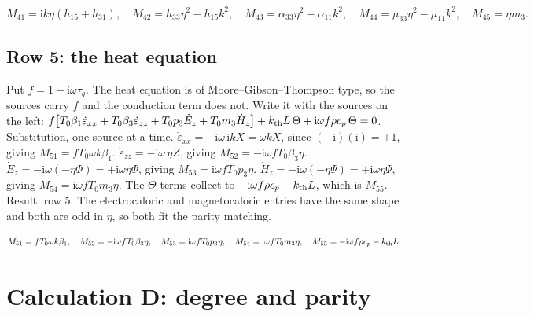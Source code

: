 \documentclass[11pt]{article}
\makeatletter
\newif\ifshowworked
\newenvironment{worked}{%
  \ifshowworked\par\smallskip\noindent\textit{Working.}\par\smallskip\else
  \setbox\z@\vbox\bgroup\fi}{\ifshowworked\par\smallskip\else\egroup\fi}
\newcommand{\ii}{\mathrm{i}}
\makeatother
\begin{document}
\begin{equation}
M_{41}=\ii k\eta(h_{15}+h_{31}),\quad
M_{42}=h_{33}\eta^2-h_{15}k^2,\quad
M_{43}=\alpha_{33}\eta^2-\alpha_{11}k^2,\quad
M_{44}=\mu_{33}\eta^2-\mu_{11}k^2,\quad
M_{45}=\eta m_3 .
\end{equation}

\subsection*{Row 5: the heat equation}

\begin{worked}
Put $f=1-\ii\omega\tau_q$. The heat equation is of Moore--Gibson--Thompson type, so the sources carry $f$
and the conduction term does not. Write it with the sources on the left:
$f\bigl[T_0\beta_1\dot\varepsilon_{xx}+T_0\beta_3\dot\varepsilon_{zz}+T_0p_3\dot E_z
+T_0m_3\dot H_z\bigr]+k_{\rm th}L\,\Theta+\ii\omega f\rho c_p\,\Theta=0$.
Substitution, one source at a time.
$\dot\varepsilon_{xx}=-\ii\omega\,\ii kX=\omega kX$, since $(-\ii)(\ii)=+1$, giving
$M_{51}=fT_0\omega k\beta_1$.
$\dot\varepsilon_{zz}=-\ii\omega\,\eta Z$, giving $M_{52}=-\ii\omega fT_0\beta_3\eta$.
$\dot E_z=-\ii\omega(-\eta\Phi)=+\ii\omega\eta\Phi$, giving $M_{53}=\ii\omega fT_0p_3\eta$.
$\dot H_z=-\ii\omega(-\eta\Psi)=+\ii\omega\eta\Psi$, giving $M_{54}=\ii\omega fT_0m_3\eta$.
The $\Theta$ terms collect to $-\ii\omega f\rho c_p-k_{\rm th}L$, which is $M_{55}$.
Result: row 5. The electrocaloric and magnetocaloric entries have the same shape and both are odd in
$\eta$, so both fit the parity matching.
\end{worked}

\begin{equation}
M_{51}=fT_0\omega k\beta_1,\quad
M_{52}=-\ii\omega fT_0\beta_3\eta,\quad
M_{53}=\ii\omega fT_0p_3\eta,\quad
M_{54}=\ii\omega fT_0m_3\eta,\quad
M_{55}=-\ii\omega f\rho c_p-k_{\rm th}L .
\end{equation}

\section{Calculation D: degree and parity}\label{sec:calcD}
\end{document}
